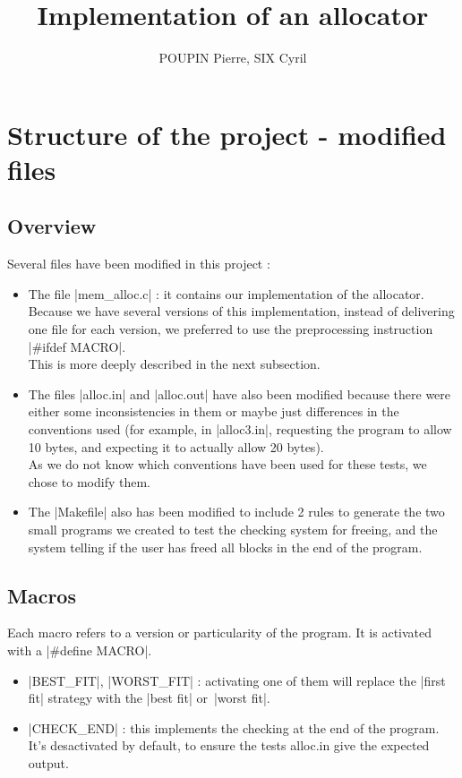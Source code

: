 \documentclass[twoside]{article}
\author{POUPIN Pierre, SIX Cyril}
\title{Implementation of an allocator}
\begin{document}
\maketitle
\section{Structure of the project - modified files}
\subsection{Overview}
Several files have been modified in this project :
\begin{itemize}
	\item The file |mem_alloc.c| : it contains our implementation of the
		allocator. Because we have several versions of this implementation,
		instead of delivering one file for each version, we preferred to use
		the preprocessing instruction |#ifdef MACRO|.\\
		This is more deeply described in the next subsection.
	\item The files |alloc.in| and |alloc.out| have also been modified because
		there were either some inconsistencies in them or maybe just
		differences in the conventions used (for example, in |alloc3.in|,
		requesting the program to allow 10 bytes, and expecting it to actually
		allow 20 bytes).\\
		As we do not know which conventions have been used for these tests, we
		chose to modify them.
	\item The |Makefile| also has been modified to include 2 rules to generate
		the two small programs we created to test the checking system for
		freeing, and the system telling if the user has freed all blocks in the
		end of the program.
\end{itemize}

\subsection{Macros}
Each macro refers to a version or particularity of the program. It is activated
with a |#define MACRO|.
\begin{itemize}
	\item |BEST_FIT|, |WORST_FIT| : activating one of them will replace the
		|first fit| strategy with the |best fit| or |worst fit|.
	\item |CHECK_END| : this implements the checking at the end of the program.
		It's desactivated by default, to ensure the tests alloc.in give the 
		expected output.
\end{itemize}
\end{document}
